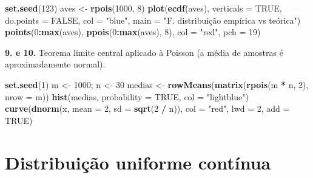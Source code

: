 \documentclass[
  portuguese,
  11pt,
  openany]{book}
\newenvironment{Shaded}{\begin{snugshade}}{\end{snugshade}}
\newcommand{\AttributeTok}[1]{\textcolor[rgb]{0.13,0.29,0.53}{#1}}
\newcommand{\ConstantTok}[1]{\textcolor[rgb]{0.56,0.35,0.01}{#1}}
\newcommand{\DecValTok}[1]{\textcolor[rgb]{0.00,0.00,0.81}{#1}}
\newcommand{\FunctionTok}[1]{\textcolor[rgb]{0.13,0.29,0.53}{\textbf{#1}}}
\newcommand{\NormalTok}[1]{#1}
\newcommand{\OtherTok}[1]{\textcolor[rgb]{0.56,0.35,0.01}{#1}}
\newcommand{\SpecialCharTok}[1]{\textcolor[rgb]{0.81,0.36,0.00}{\textbf{#1}}}
\newcommand{\StringTok}[1]{\textcolor[rgb]{0.31,0.60,0.02}{#1}}
\begin{document}
\begin{Shaded}
\begin{Highlighting}[]
\FunctionTok{set.seed}\NormalTok{(}\DecValTok{123}\NormalTok{)}
\NormalTok{aves }\OtherTok{\textless{}{-}} \FunctionTok{rpois}\NormalTok{(}\DecValTok{1000}\NormalTok{, }\DecValTok{8}\NormalTok{)}
\FunctionTok{plot}\NormalTok{(}\FunctionTok{ecdf}\NormalTok{(aves), }\AttributeTok{verticals =} \ConstantTok{TRUE}\NormalTok{, }\AttributeTok{do.points =} \ConstantTok{FALSE}\NormalTok{, }\AttributeTok{col =} \StringTok{"blue"}\NormalTok{,}
     \AttributeTok{main =} \StringTok{"F. distribuição empírica vs teórica"}\NormalTok{)}
\FunctionTok{points}\NormalTok{(}\DecValTok{0}\SpecialCharTok{:}\FunctionTok{max}\NormalTok{(aves), }\FunctionTok{ppois}\NormalTok{(}\DecValTok{0}\SpecialCharTok{:}\FunctionTok{max}\NormalTok{(aves), }\DecValTok{8}\NormalTok{), }\AttributeTok{col =} \StringTok{"red"}\NormalTok{, }\AttributeTok{pch =} \DecValTok{19}\NormalTok{)}
\end{Highlighting}
\end{Shaded}

\textbf{9. e 10.} Teorema limite central aplicado à Poisson (a média de amostras é
aproximadamente normal).

\begin{Shaded}
\begin{Highlighting}[]
\FunctionTok{set.seed}\NormalTok{(}\DecValTok{1}\NormalTok{)}
\NormalTok{m }\OtherTok{\textless{}{-}} \DecValTok{1000}\NormalTok{; n }\OtherTok{\textless{}{-}} \DecValTok{30}
\NormalTok{medias }\OtherTok{\textless{}{-}} \FunctionTok{rowMeans}\NormalTok{(}\FunctionTok{matrix}\NormalTok{(}\FunctionTok{rpois}\NormalTok{(m }\SpecialCharTok{*}\NormalTok{ n, }\DecValTok{2}\NormalTok{), }\AttributeTok{nrow =}\NormalTok{ m))}
\FunctionTok{hist}\NormalTok{(medias, }\AttributeTok{probability =} \ConstantTok{TRUE}\NormalTok{, }\AttributeTok{col =} \StringTok{"lightblue"}\NormalTok{)}
\FunctionTok{curve}\NormalTok{(}\FunctionTok{dnorm}\NormalTok{(x, }\AttributeTok{mean =} \DecValTok{2}\NormalTok{, }\AttributeTok{sd =} \FunctionTok{sqrt}\NormalTok{(}\DecValTok{2} \SpecialCharTok{/}\NormalTok{ n)), }\AttributeTok{col =} \StringTok{"red"}\NormalTok{, }\AttributeTok{lwd =} \DecValTok{2}\NormalTok{, }\AttributeTok{add =} \ConstantTok{TRUE}\NormalTok{)}
\end{Highlighting}
\end{Shaded}

\section{Distribuição uniforme contínua}\label{distribuiuxe7uxe3o-uniforme-contuxednua-1}
\end{document}
